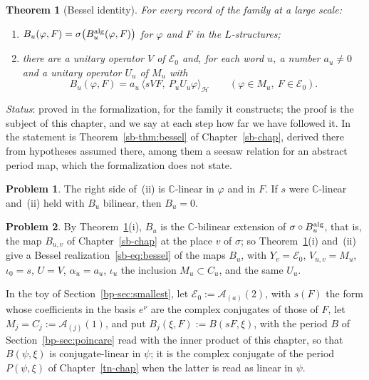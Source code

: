 \documentclass[reqno]{amsart}
\newcounter{chap}
\theoremstyle{definition}
\newtheorem{problem}{Problem}[section]
\theoremstyle{plain}
\newtheorem{theorem}{Theorem}[section]
\theoremstyle{remark}
\newcommand{\C}{\mathbb C}
\newcommand{\Hc}{\mathcal H}
\newcommand{\Ac}{\mathcal A}
\newcommand{\Ec}{\mathcal E}
\begin{document}
\begin{theorem}[Bessel identity]\label{thm:bessel}
For every record of the family at a large scale:
\begin{enumerate}
\item[(i)] \(B_u(\varphi,F)=\sigma\bigl(B_u^{\rm alg}(\varphi,F)\bigr)\) for \(\varphi\) and \(F\) in the \(L\)-structures;
\item[(ii)] there are a unitary operator \(V\) of \(\Ec_0\) and, for each word \(u\), a number \(a_u\ne0\) and a unitary operator \(U_u\) of \(M_u\) with
\[
 B_u(\varphi,F)=a_u\,\langle sVF,\ P_uU_u\varphi\rangle_\Hc\qquad(\varphi\in M_u,\ F\in\Ec_0).
\]
\end{enumerate}
\end{theorem}
\noindent\emph{Status}: proved in the formalization, for the family it constructs; the proof is the subject of this chapter, and we say at each step how far we have followed it.  In \cite{Adr} the statement is Theorem~\ref{sb-thm:bessel} of Chapter~\ref{sb-chap}, derived there from hypotheses assumed there, among them a seesaw relation for an abstract period map, which the formalization does not state.

\begin{problem}\label{pr:conj}
The right side of~(ii) is \(\C\)-linear in \(\varphi\) and in \(F\).  If \(s\) were \(\C\)-linear and~(ii) held with \(B_u\) bilinear, then \(B_u=0\).
\end{problem}

\begin{problem}\label{pr:realization}
By Theorem~\ref{thm:bessel}(i), \(B_u\) is the \(\C\)-bilinear extension of \(\sigma\circ B_u^{\rm alg}\), that is, the map \(B_{u,v}\) of Chapter~\ref{sb-chap} at the place \(v\) of \(\sigma\); so Theorem~\ref{thm:bessel}(i) and~(ii) give a Bessel realization~\eqref{sb-eq:bessel} of the maps \(B_u\), with \(Y_v=\Ec_0\), \(V_{u,v}=M_u\), \(\iota_0=s\), \(U=V\), \(\alpha_u=a_u\), \(\iota_u\) the inclusion \(M_u\subset C_u\), and the same \(U_u\).
\end{problem}

In the toy of Section~\ref{bp-sec:smallest}, let \(\Ec_0:=\Ac_{(a)}(2)\), with \(s(F)\) the form whose coefficients in the basis \(e^\nu\) are the complex conjugates of those of \(F\), let \(M_j=C_j:=\Ac_{(j)}(1)\), and put \(B_j(\xi,F):=B(sF,\xi)\), with the period \(B\) of Section~\ref{bp-sec:poincare} read with the inner product of this chapter, so that \(B(\psi,\xi)\) is conjugate-linear in \(\psi\); it is the complex conjugate of the period \(P(\psi,\xi)\) of Chapter~\ref{tn-chap} when the latter is read as linear in \(\psi\).
\end{document}
